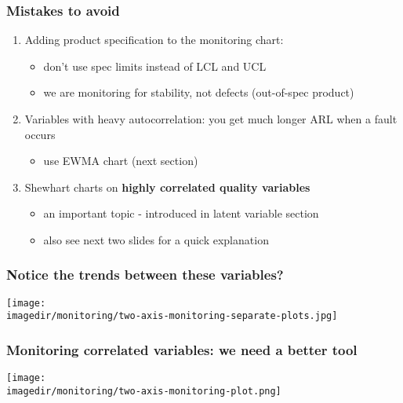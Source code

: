 \begin{frame}\frametitle{Mistakes to avoid}
	\begin{enumerate}
		\item	Adding product specification to the monitoring chart:
		\begin{itemize}
			\item	don't use spec limits instead of LCL and UCL
			\item	we are monitoring for stability, not defects (out-of-spec product)
		\end{itemize}
		\item	Variables with heavy autocorrelation: you get much longer ARL when a fault occurs
		\begin{itemize}
			\item	use EWMA chart (next section)
		\end{itemize}
		\item	Shewhart charts on \textbf{highly correlated quality variables}
		\begin{itemize}
			\item	an important topic - introduced in latent variable section
			\item	also see next two slides for a quick explanation
		\end{itemize}
	\end{enumerate}
\end{frame}

\begin{frame}\frametitle{Notice the trends between these variables?}
	\begin{center}
		\texttt{[image: \\imagedir/monitoring/two-axis-monitoring-separate-plots.jpg]}
	\end{center}
\end{frame}

\begin{frame}\frametitle{Monitoring correlated variables: we need a better tool}
	\begin{center}
		\texttt{[image: \\imagedir/monitoring/two-axis-monitoring-plot.png]}
	\end{center}
\end{frame}

